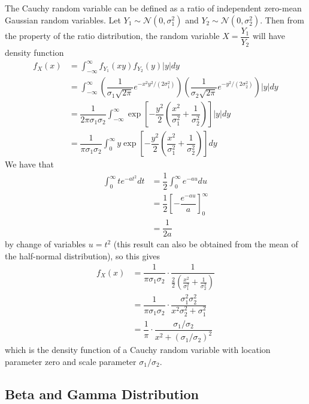 \documentclass[11pt]{report} %
\begin{document}
The Cauchy random variable can be defined as a ratio of independent zero-mean Gaussian random variables. Let $Y_{1} \sim \mathcal{N}\left(0, \sigma_{1}^{2}\right)$ and $Y_{2} \sim \mathcal{N}\left(0, \sigma_{2}^{2}\right)$. Then from the property of the ratio distribution, the random variable $X = \dfrac{Y_{1}}{Y_{2}}$ will have density function
\begin{align}
f_{X}\left(x\right) &= \int_{-\infty}^{\infty}f_{Y_{1}}\left(xy\right)f_{Y_{2}}\left(y\right)\left|y\right|dy \\
&= \int_{-\infty}^{\infty}\left(\dfrac{1}{\sigma_{1}\sqrt{2\pi}}e^{-x^{2}y^{2}/\left(2\sigma_{1}^{2}\right)}\right)\left(\dfrac{1}{\sigma_{2}\sqrt{2\pi}}e^{-y^{2}/\left(2\sigma_{2}^{2}\right)}\right)\left|y\right|dy \\
&= \dfrac{1}{2\pi\sigma_{1}\sigma_{2}}\int_{-\infty}^{\infty}\exp\left[-\dfrac{y^{2}}{2}\left(\dfrac{x^{2}}{\sigma_{1}^{2}} + \dfrac{1}{\sigma_{2}^{2}}\right)\right]\left|y\right|dy \\
&= \dfrac{1}{\pi\sigma_{1}\sigma_{2}}\int_{0}^{\infty}y\exp\left[-\dfrac{y^{2}}{2}\left(\dfrac{x^{2}}{\sigma_{1}^{2}} + \dfrac{1}{\sigma_{2}^{2}}\right)\right]dy
\end{align}
We have that
\begin{align}
\int_{0}^{\infty}te^{-at^{2}}dt &= \dfrac{1}{2}\int_{0}^{\infty}e^{-au}du \\
&= \dfrac{1}{2}\left[-\dfrac{e^{-au}}{a}\right]_{0}^{\infty} \\
&= \dfrac{1}{2a}
\end{align}
by change of variables $u = t^{2}$ (this result can also be obtained from the mean of the half-normal distribution), so this gives
\begin{align}
f_{X}\left(x\right) &= \dfrac{1}{\pi\sigma_{1}\sigma_{2}}\cdot\dfrac{1}{\frac{2}{2}\left(\frac{x^{2}}{\sigma_{1}^{2}}+\frac{1}{\sigma_{2}^{2}}\right)} \\
&= \dfrac{1}{\pi\sigma_{1}\sigma_{2}}\cdot\dfrac{\sigma_{1}^{2}\sigma_{2}^{2}}{x^{2}\sigma_{2}^{2}+\sigma_{1}^{2}} \\
&= \dfrac{1}{\pi}\cdot\dfrac{\sigma_{1}/\sigma_{2}}{x^{2}+\left(\sigma_{1}/\sigma_{2}\right)^{2}}
\end{align}
which is the density function of a Cauchy random variable with location parameter zero and scale parameter $\sigma_{1}/\sigma_{2}$.

\subsection{Beta and Gamma Distribution}
\end{document}
